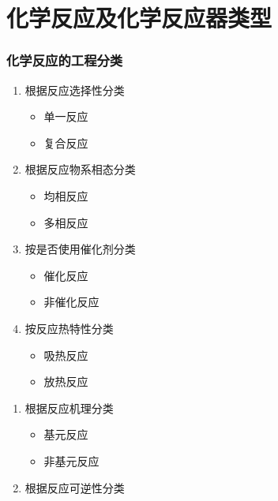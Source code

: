 \documentclass[dvipsnames, svgnames, x11names]{beamer}
\begin{document}
\section{化学反应及化学反应器类型}


\begin{frame}
    \frametitle{化学反应的工程分类}
    \begin{minipage}{0.44\linewidth}
        \begin{enumerate}
            \item 根据反应选择性分类
              \begin{itemize}
                \item 单一反应
                \item 复合反应
              \end{itemize}
            \item 根据反应物系相态分类
              \begin{itemize}
                \item 均相反应
                \item 多相反应
              \end{itemize}
            \item 按是否使用催化剂分类
              \begin{itemize}
                \item 催化反应
                \item 非催化反应
              \end{itemize}
            \item 按反应热特性分类
              \begin{itemize}
                \item 吸热反应
                \item 放热反应
              \end{itemize}
          \end{enumerate}
    \end{minipage}\hfill
    \begin{minipage}{0.44\linewidth}
        \begin{enumerate}
            \item[5.] 根据反应机理分类
              \begin{itemize}
                \item 基元反应
                \item 非基元反应
              \end{itemize}
            \item[6.] 根据反应可逆性分类

\end{enumerate}
\end{minipage}
\end{frame}
\end{document}

